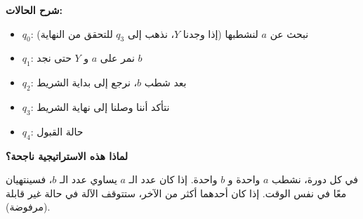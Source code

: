\documentclass[14pt]{extarticle}
\begin{document}
\textbf{شرح الحالات:}
\begin{itemize}
    \item $q_0$: نبحث عن $a$ لنشطبها (إذا وجدنا $Y$، نذهب إلى $q_3$ للتحقق من النهاية)
    \item $q_1$: نمر على $a$ و $Y$ حتى نجد $b$
    \item $q_2$: بعد شطب $b$، نرجع إلى بداية الشريط
    \item $q_3$: نتأكد أننا وصلنا إلى نهاية الشريط
    \item $q_4$: حالة القبول
\end{itemize}




\begin{boxNote}
\textbf{لماذا هذه الاستراتيجية ناجحة؟}

في كل دورة، نشطب $a$ واحدة و $b$ واحدة. إذا كان عدد الـ $a$ يساوي عدد الـ $b$، فسينتهيان معًا في نفس الوقت. إذا كان أحدهما أكثر من الآخر، ستتوقف الآلة في حالة غير قابلة (مرفوضة).
\end{boxNote}
\end{document}

